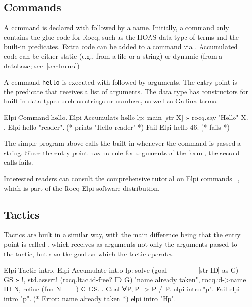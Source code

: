 \documentclass{these-ISSS}
\newenvironment{rocqcode}
  {\VerbatimEnvironment\begin{rocqbox}\begin{xrocqcode}}{\end{xrocqcode}
\end{rocqbox}}
\begin{document}
\subsection{Commands}

A command is declared with  followed by a name. Initially,
a command only contains the glue code for Rocq, such as the HOAS data type of
terms and the built-in predicates. Extra code can be added to a command via
. Accumulated code can be either static (e.g., from a
file or a string) or dynamic (from a database; see~\cref{sec:homo}).

A command \texttt{hello} is executed with  followed by
arguments. The entry point is the  predicate
that receives a list of arguments. The  data type has constructors for built-in data
types such as strings or numbers, as well as Gallina terms.

\begin{rocqcode}
Elpi Command hello.
Elpi Accumulate hello lp:{{
  main [str X] :- rocq.say "Hello" X.
}}.
Elpi hello "reader".    (* prints "Hello reader" *)
Fail Elpi hello 46.     (* fails *)
\end{rocqcode}

The simple program above calls the  built-in whenever the
command is passed a string. Since the entry point  has no rule for
arguments of the form , the second calls fails.

Interested readers can consult the comprehensive tutorial on Elpi commands
~\cite{tuto:commands}, which is part of the Rocq-Elpi software distribution.

\subsection{Tactics}


Tactics are built in a similar way, with the main difference being that the
entry point is called , which receives as arguments not only the
arguments passed to the tactic, but also the goal on which the tactic
operates.

\begin{rocqcode}
Elpi Tactic intro.
Elpi Accumulate intro lp:{{
  solve (goal _ _ _ _ [str ID] as G) GS :- !,
    std.assert! (rocq.ltac.id-free? ID G) "name already taken",
    rocq.id->name ID N,
    refine (fun N _ _) G GS.
}}.
Goal ∀P, P -> P /\ P.
elpi intro "p".
Fail elpi intro "p". (* Error: name already taken *)
elpi intro "Hp".
\end{rocqcode}
\end{document}
